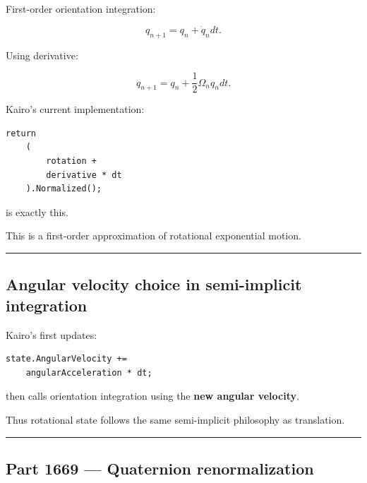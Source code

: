\hypertarget{06-engine-ii-ch037-part-1668-quaternion-orientation-integration}{}

First-order orientation integration:

\[
q_{n+1}
=
q_n+
\dot q_n dt.
\]

Using derivative:

\[
\boxed{
q_{n+1}
=
q_n+
\frac12
\Omega_n q_n dt.
}
\]

Kairo's current implementation:

\begin{verbatim}
return
    (
        rotation +
        derivative * dt
    ).Normalized();
\end{verbatim}

is exactly this.

This is a first-order approximation of rotational exponential motion.

\begin{center}\rule{0.5\linewidth}{0.5pt}\end{center}

\subsection{Angular velocity choice in semi-implicit integration}\label{06-engine-ii-ch037-angular-velocity-choice-in-semi-implicit-integration}

\hypertarget{06-engine-ii-ch037-angular-velocity-choice-in-semi-implicit-integration}{}

Kairo's  first updates:

\begin{verbatim}
state.AngularVelocity +=
    angularAcceleration * dt;
\end{verbatim}

then calls orientation integration using the \textbf{new angular velocity}.

Thus rotational state follows the same semi-implicit philosophy as translation.

\begin{center}\rule{0.5\linewidth}{0.5pt}\end{center}

\subsection{Part 1669 --- Quaternion renormalization}\label{06-engine-ii-ch037-part-1669-quaternion-renormalization}

\hypertarget{06-engine-ii-ch037-part-1669-quaternion-renormalization}{}

